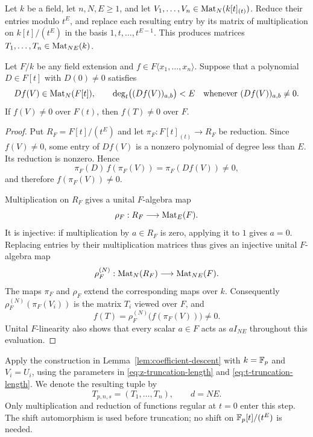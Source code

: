 \begin{lemma}\label{lem:coefficient-descent}
 Let $k$ be a field, let $n,N,E\geq1$, and let
 $V_1,\ldots,V_n\in\operatorname{Mat}_N(k[t]_{(t)})$.  Reduce their entries modulo $t^E$,
 and replace each resulting entry by its matrix of multiplication on
 $k[t]/(t^E)$ in the basis $1,t,\ldots,t^{E-1}$.  This produces matrices
 $T_1,\ldots,T_n\in\operatorname{Mat}_{NE}(k)$.

 Let $F/k$ be any field extension and
 $f\in F\langle x_1,\ldots,x_n\rangle$.  Suppose that a polynomial
 $D\in F[t]$ with $D(0)\ne0$ satisfies
 \[
  Df(V)\in\operatorname{Mat}_N(F[t]),
  \qquad \deg_t\bigl((Df(V))_{a,b}\bigr)<E
  \quad\text{whenever }(Df(V))_{a,b}\ne0.
 \]
 If $f(V)\ne0$ over $F(t)$, then $f(T)\ne0$ over $F$.
\end{lemma}

\begin{proof}
 Put $R_F=F[t]/(t^E)$ and let
 $\pi_F:F[t]_{(t)}\longrightarrow R_F$ be reduction.  Since $f(V)\ne0$,
 some entry of $Df(V)$ is a nonzero polynomial of degree less than $E$.
 Its reduction is nonzero.  Hence
 \[
   \pi_F(D)\,f(\pi_F(V))=\pi_F(Df(V))\ne0,
 \]
 and therefore $f(\pi_F(V))\ne0$.

 Multiplication on $R_F$ gives a unital $F$-algebra map
 \[
  \rho_F:R_F\longrightarrow\operatorname{Mat}_E(F).
 \]
 It is injective: if multiplication by $a\in R_F$ is zero, applying it to
 $1$ gives $a=0$.  Replacing entries by their multiplication matrices thus
 gives an injective unital $F$-algebra map
 \[
  \rho_F^{(N)}:\operatorname{Mat}_N(R_F)\longrightarrow\operatorname{Mat}_{NE}(F).
 \]
 The maps $\pi_F$ and $\rho_F$ extend the corresponding maps over $k$.
 Consequently $\rho_F^{(N)}(\pi_F(V_i))$ is the matrix $T_i$ viewed over $F$,
 and
 \[
   f(T)=\rho_F^{(N)}\bigl(f(\pi_F(V))\bigr)\ne0.
 \]
 Unital $F$-linearity also shows that every scalar $a\in F$ acts as
 $aI_{NE}$ throughout this evaluation.
\end{proof}

Apply the construction in Lemma~\ref{lem:coefficient-descent} with
$k=\mathbb F_p$ and $V_i=U_i$, using the parameters in
\eqref{eq:z-truncation-length} and \eqref{eq:t-truncation-length}.  We denote
the resulting tuple by
\begin{equation}\label{eq:prime-field-tuple}
 T_{p,n,s}=(T_1,\ldots,T_n),\qquad d=NE.
\end{equation}
Only multiplication and reduction of functions regular at $t=0$ enter this
step.  The shift automorphism is used before truncation; no shift on
$\mathbb F_p[t]/(t^E)$ is needed.

